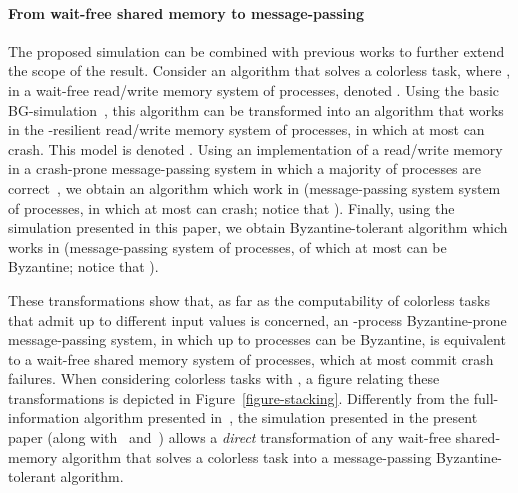 \documentclass[11pt,letterpaper]{article}
\begin{document}
\paragraph{From wait-free shared memory to message-passing}
The proposed simulation can be combined with previous works
to further extend the  scope of the result. 
Consider an algorithm  that solves a colorless task, where ,
in a wait-free read/write memory system of  processes, denoted 
.
Using the basic BG-simulation~\cite{BG93}, 
this algorithm can be transformed into an algorithm  
that works in the -resilient read/write memory system 
of  processes, in which at most  can crash. 
This model is denoted .
Using an implementation
of a read/write memory in a crash-prone message-passing system in which a 
majority of processes are correct~\cite{ABD95}, we obtain an algorithm  
  which work in 
(message-passing system 
system of  processes, in which at most  can crash; 
notice that ). 
Finally, using the simulation presented in this paper, we  obtain 
Byzantine-tolerant algorithm  which works in 
  (message-passing  system of  
processes, of which at most  can be Byzantine; notice that
).

These transformations show that, as far as the computability of
colorless tasks that admit up to  different input values is
concerned, an -process Byzantine-prone message-passing system, in
which up to  processes can be Byzantine, is equivalent to
a wait-free shared memory system of  processes, which at most
commit crash failures.  When considering colorless tasks with , a
figure relating these transformations is depicted in
Figure~\ref{figure-stacking}.  Differently from the 
full-information algorithm presented in~\cite{MTH14}, 
the simulation presented in the present paper
(along with~\cite{BG93} and~\cite{ABD95}) allows a {\it direct}
transformation of any wait-free shared-memory algorithm that solves a
colorless task into a message-passing Byzantine-tolerant algorithm.
\end{document}
